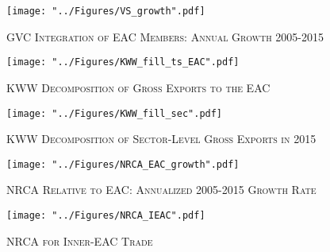 \documentclass[a4paper]{article}
\begin{document}
\begin{figure}[h!]
\centering
\caption{\label{fig:VSgr}\textsc{GVC Integration of EAC Members: Annual Growth 2005-2015}}
\texttt{[image: "../Figures/VS\_growth".pdf]} %
\end{figure}
\FloatBarrier


\begin{figure}[h!] 
\centering
\caption{\label{fig:KWW_fill_ts_EAC}\textsc{KWW Decomposition of Gross Exports to the EAC}}
\texttt{[image: "../Figures/KWW\_fill\_ts\_EAC".pdf]} %
\end{figure}
\FloatBarrier

\begin{figure}[h!] 
\centering
\caption{\label{fig:KWW_fill_sec}\textsc{KWW Decomposition of Sector-Level Gross Exports in 2015}}
\texttt{[image: "../Figures/KWW\_fill\_sec".pdf]} %
\end{figure}
\FloatBarrier

\begin{figure}[h!]
\centering
\caption{\label{fig:NRCA_EAC_growth}\textsc{NRCA Relative to EAC: Annualized 2005-2015 Growth Rate}}
\texttt{[image: "../Figures/NRCA\_EAC\_growth".pdf]} %
\end{figure}
\FloatBarrier


\begin{figure}[h!]
\centering
\caption{\label{fig:NRCA_IEAC}\textsc{NRCA for Inner-EAC Trade}}
\texttt{[image: "../Figures/NRCA\_IEAC".pdf]} %
\end{figure}
\FloatBarrier
\end{document}
